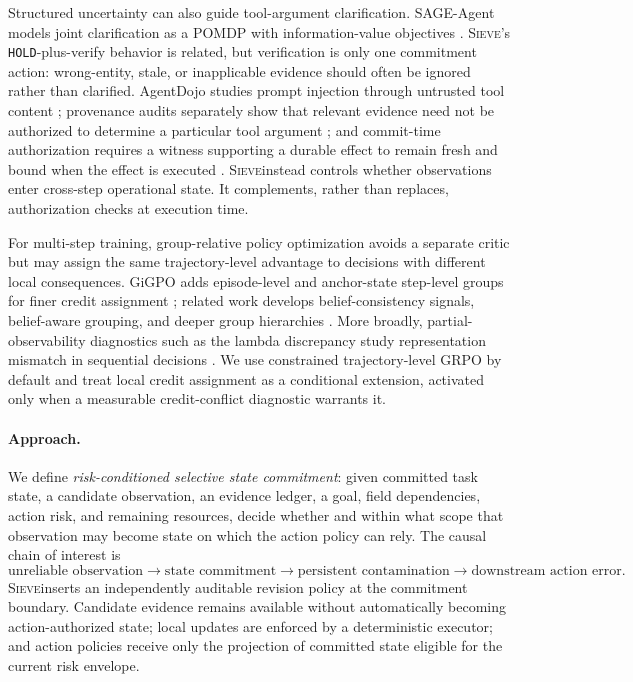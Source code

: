 \documentclass{article}
\newcommand{\method}{\textsc{Sieve}}
\newcommand{\hold}{\texttt{HOLD}}
\begin{document}
Structured uncertainty can also guide tool-argument clarification. SAGE-Agent models joint clarification as a POMDP with information-value objectives \citep{suri2025structured}. \method's \hold-plus-verify behavior is related, but verification is only one commitment action: wrong-entity, stale, or inapplicable evidence should often be ignored rather than clarified. AgentDojo studies prompt injection through untrusted tool content \citep{debenedetti2024agentdojo}; provenance audits separately show that relevant evidence need not be authorized to determine a particular tool argument \citep{liao2026provenance}; and commit-time authorization requires a witness supporting a durable effect to remain fresh and bound when the effect is executed \citep{santosgrueiro2026temporary}. \method instead controls whether observations enter cross-step operational state. It complements, rather than replaces, authorization checks at execution time.

For multi-step training, group-relative policy optimization avoids a separate critic but may assign the same trajectory-level advantage to decisions with different local consequences. GiGPO adds episode-level and anchor-state step-level groups for finer credit assignment \citep{feng2025gigpo}; related work develops belief-consistency signals, belief-aware grouping, and deeper group hierarchies \citep{tang2026rewarding,he2026hgpo}. More broadly, partial-observability diagnostics such as the lambda discrepancy study representation mismatch in sequential decisions \citep{allen2024lambda}. We use constrained trajectory-level GRPO by default and treat local credit assignment as a conditional extension, activated only when a measurable credit-conflict diagnostic warrants it.

\paragraph{Approach.}
We define \emph{risk-conditioned selective state commitment}: given committed task state, a candidate observation, an evidence ledger, a goal, field dependencies, action risk, and remaining resources, decide whether and within what scope that observation may become state on which the action policy can rely. The causal chain of interest is
\begin{equation}
\text{unreliable observation}
\rightarrow \text{state commitment}
\rightarrow \text{persistent contamination}
\rightarrow \text{downstream action error}.
\label{eq:causal-chain}
\end{equation}
\method inserts an independently auditable revision policy at the commitment boundary. Candidate evidence remains available without automatically becoming action-authorized state; local updates are enforced by a deterministic executor; and action policies receive only the projection of committed state eligible for the current risk envelope.
\end{document}
